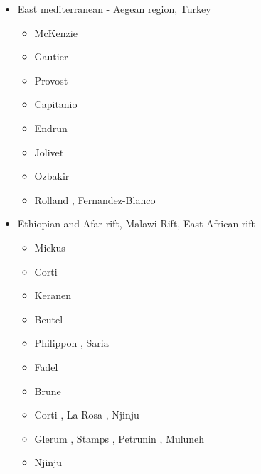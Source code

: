 \begin{itemize}
\item{East mediterranean - Aegean region, Turkey} 

\begin{scriptsize}
\begin{itemize}
\item[\nineteenseventyeight] McKenzie \cite{mcke78b}
\item[\nineteenninetynine] Gautier \etal \cite{gabm99}
\item[\twothousandthree] Provost \etal \cite{prch03}
\item[\twothousandten] Capitanio \etal \cite{cazf10}
\item[\twothousandeleven] Endrun \etal \cite{enlm11}
\item[\twothousandthirteen] Jolivet \etal \cite{jofh13}
\item[\twothousandseventeen] Ozbakir \etal \cite{ozgw17}
\item[\twothousandtwenty] Rolland \etal \cite{rohb20}, Fernandez-Blanco \etal \cite{femb20}
\end{itemize}
\end{scriptsize}

\item{Ethiopian and Afar rift, Malawi Rift, East African rift} 

\begin{scriptsize}
\begin{itemize}
\item[\twothousandseven] Mickus \etal \cite{mitk07}
\item[\twothousandeight] Corti \cite{cort08}
\item[\twothousandnine] Keranen \etal \cite{kekj09}
\item[\twothousandten] Beutel \etal \cite{beve10}
\item[\twothousandfourteen] Philippon \etal \cite{phcs14}, Saria \etal \cite{sacs14}
\item[\twothousandfifteen] Fadel \etal \cite{favk15}
\item[\twothousandseventeen] Brune \etal \cite{brcr17} 
\item[\twothousandnineteen] Corti \etal \cite{cocf19}, La Rosa \etal \cite{lapk19}, Njinju \etal \cite{njas19}
\item[\twothousandtwenty] Glerum \etal \cite{glbs20}, Stamps \etal \cite{stkf20}, 
                          Petrunin \etal \cite{peke20}, Muluneh \etal \cite{mubi20}
\item[\twothousandtwentyone] Njinju \etal \cite{njsn21} 
\end{itemize}
\end{scriptsize}


\end{itemize}

